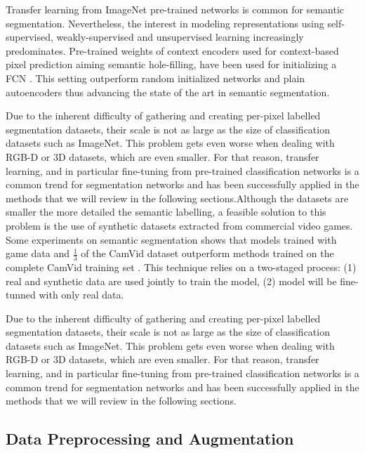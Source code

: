 Transfer learning from ImageNet pre-trained networks is common for semantic segmentation. Nevertheless, the interest in modeling representations using self-supervised, weakly-supervised and unsupervised learning increasingly predominates. Pre-trained weights of context encoders used for context-based pixel prediction aiming semantic hole-filling, have been used for initializing a \acs{FCN} \cite{Pathak2016}. This setting outperform random initialized networks and plain autoencoders thus advancing the state of the art in semantic segmentation.

Due to the inherent difficulty of gathering and creating per-pixel labelled segmentation datasets, their scale is not as large as the size of classification datasets such as ImageNet\cite{Deng2009}\cite{Russakovsky2015}. This problem gets even worse when dealing with \acs{RGB-D} or \acs{3D} datasets, which are even smaller. For that reason, transfer learning, and in particular fine-tuning from pre-trained classification networks is a common trend for segmentation networks and has been successfully applied in the methods that we will review in the following sections.Although the datasets are smaller the more detailed the semantic labelling, a feasible solution to this problem is the use of synthetic datasets extracted from commercial video games. Some experiments on semantic segmentation shows that models trained with game data and $\frac{1}{3}$ of the CamVid dataset outperform methods trained on the complete CamVid training set \cite{Richter2016}. This technique relies on a two-staged process: (1) real and synthetic data are used jointly to train the model, (2) model will be fine-tunned with only real data.

Due to the inherent difficulty of gathering and creating per-pixel labelled segmentation datasets, their scale is not as large as the size of classification datasets such as ImageNet\cite{Deng2009}\cite{Russakovsky2015}. This problem gets even worse when dealing with \acs{RGB-D} or \acs{3D} datasets, which are even smaller. For that reason, transfer learning, and in particular fine-tuning from pre-trained classification networks is a common trend for segmentation networks and has been successfully applied in the methods that we will review in the following sections.

\subsection{Data Preprocessing and Augmentation}

